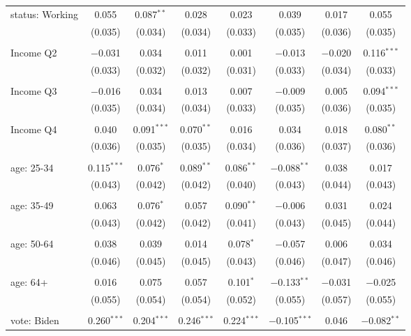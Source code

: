 \begin{tabular}{@{\extracolsep{5pt}}lccccccc}
 status: Working & 0.055 & 0.087$^{**}$ & 0.028 & 0.023 & 0.039 & 0.017 & 0.055 \\ 
  & (0.035) & (0.034) & (0.034) & (0.033) & (0.035) & (0.036) & (0.035) \\ 
  & & & & & & & \\ 
 Income Q2 & $-$0.031 & 0.034 & 0.011 & 0.001 & $-$0.013 & $-$0.020 & 0.116$^{***}$ \\ 
  & (0.033) & (0.032) & (0.032) & (0.031) & (0.033) & (0.034) & (0.033) \\ 
  & & & & & & & \\ 
 Income Q3 & $-$0.016 & 0.034 & 0.013 & 0.007 & $-$0.009 & 0.005 & 0.094$^{***}$ \\ 
  & (0.035) & (0.034) & (0.034) & (0.033) & (0.035) & (0.036) & (0.035) \\ 
  & & & & & & & \\ 
 Income Q4 & 0.040 & 0.091$^{***}$ & 0.070$^{**}$ & 0.016 & 0.034 & 0.018 & 0.080$^{**}$ \\ 
  & (0.036) & (0.035) & (0.035) & (0.034) & (0.036) & (0.037) & (0.036) \\ 
  & & & & & & & \\ 
 age: 25-34 & 0.115$^{***}$ & 0.076$^{*}$ & 0.089$^{**}$ & 0.086$^{**}$ & $-$0.088$^{**}$ & 0.038 & 0.017 \\ 
  & (0.043) & (0.042) & (0.042) & (0.040) & (0.043) & (0.044) & (0.043) \\ 
  & & & & & & & \\ 
 age: 35-49 & 0.063 & 0.076$^{*}$ & 0.057 & 0.090$^{**}$ & $-$0.006 & 0.031 & 0.024 \\ 
  & (0.043) & (0.042) & (0.042) & (0.041) & (0.043) & (0.045) & (0.044) \\ 
  & & & & & & & \\ 
 age: 50-64 & 0.038 & 0.039 & 0.014 & 0.078$^{*}$ & $-$0.057 & 0.006 & 0.034 \\ 
  & (0.046) & (0.045) & (0.045) & (0.043) & (0.046) & (0.047) & (0.046) \\ 
  & & & & & & & \\ 
 age: 64+ & 0.016 & 0.075 & 0.057 & 0.101$^{*}$ & $-$0.133$^{**}$ & $-$0.031 & $-$0.025 \\ 
  & (0.055) & (0.054) & (0.054) & (0.052) & (0.055) & (0.057) & (0.055) \\ 
  & & & & & & & \\ 
 vote: Biden & 0.260$^{***}$ & 0.204$^{***}$ & 0.246$^{***}$ & 0.224$^{***}$ & $-$0.105$^{***}$ & 0.046 & $-$0.082$^{**}$ \\ 

\end{tabular}
